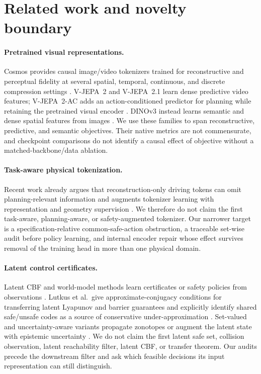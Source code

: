 \section{Related work and novelty boundary}

\paragraph{Pretrained visual representations.}
Cosmos provides causal image/video tokenizers trained for reconstructive and perceptual fidelity at
several spatial, temporal, continuous, and discrete compression settings
\citep{nvidia2025cosmos,nvidia2025cosmostokenizer}.  V-JEPA~2 and V-JEPA~2.1 learn dense predictive
video features; V-JEPA~2-AC adds an action-conditioned predictor for planning while retaining the
pretrained visual encoder \citep{assran2025vjepa2,murlabadia2026vjepa21}.  DINOv3 instead learns
semantic and dense spatial features from images \citep{simeoni2025dinov3}.  We use these families to
span reconstructive, predictive, and semantic objectives.  Their native metrics are not
commensurate, and checkpoint comparisons do not identify a causal effect of objective without a
matched-backbone/data ablation.

\paragraph{Task-aware physical tokenization.}
Recent work already argues that reconstruction-only driving tokens can omit planning-relevant
information and augments tokenizer learning with representation and geometry supervision
\citep{yao2026unified}.  We therefore do not claim the first task-aware, planning-aware, or
safety-augmented tokenizer.  Our narrower target is a specification-relative common-safe-action
obstruction, a traceable set-wise audit before policy learning, and internal encoder repair whose
effect survives removal of the training head in more than one physical domain.

\paragraph{Latent control certificates.}
Latent CBF and world-model methods learn certificates or safety policies from observations
\citep{anand2025safety,nakamura2025latent,nakamura2026latentcbf}.  Lutkus et al.\ give approximate-conjugacy conditions
for transferring latent Lyapunov and barrier guarantees and explicitly identify shared safe/unsafe
codes as a source of conservative under-approximation \citep{lutkus2025latent}.  Set-valued and
uncertainty-aware variants propagate zonotopes or augment the latent state with epistemic
uncertainty \citep{wu2026points,seo2025uncertainty}.  We do not claim the first latent safe set,
collision observation, latent reachability filter, latent CBF, or transfer theorem.  Our audits
precede the downstream filter and ask which feasible decisions its input representation can still
distinguish.

